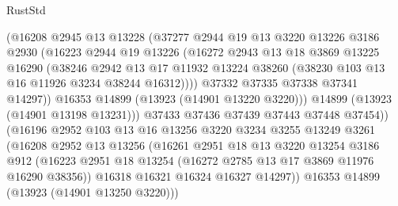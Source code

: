 \begin{lexlean}{RustStd}
\begin{coremodule}
                        (@16208
                          @2945
                          @13
                          @13228
                          (@37277
                            @2944
                            @19
                            @13
                            @3220
                            @13226
                            @3186
                            @2930
                            (@16223
                              @2944
                              @19
                              @13226
                              (@16272
                                @2943
                                @13
                                @18
                                @3869
                                @13225
                                @16290
                                (@38246
                                  @2942
                                  @13
                                  @17
                                  @11932
                                  @13224
                                  @38260
                                  (@38230 @103 @13 @16 @11926 @3234 @38244 @16312))))
                            @37332
                            @37335
                            @37338
                            @37341
                            @14297))
                        @16353
                        @14899
                        (@13923 (@14901 @13220 @3220)))
                      @14899
                      (@13923 (@14901 @13198 @13231)))
                    @37433
                    @37436
                    @37439
                    @37443
                    @37448
                    @37454))
                (@16196
                  @2952
                  @103
                  @13
                  @16
                  @13256
                  @3220
                  @3234
                  @3255
                  @13249
                  @3261
                  (@16208
                    @2952
                    @13
                    @13256
                    (@16261
                      @2951
                      @18
                      @13
                      @3220
                      @13254
                      @3186
                      @912
                      (@16223 @2951 @18 @13254 (@16272 @2785 @13 @17 @3869 @11976 @16290 @38356))
                      @16318
                      @16321
                      @16324
                      @16327
                      @14297))
                  @16353
                  @14899
                  (@13923 (@14901 @13250 @3220)))

\end{coremodule}
\end{lexlean}
